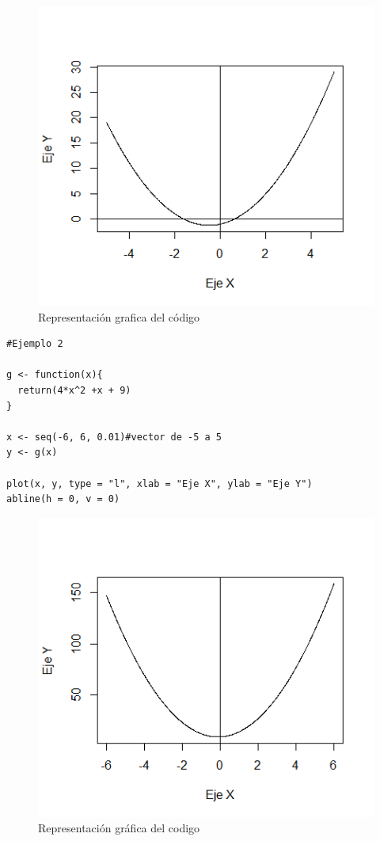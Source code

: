 \documentclass[12pt,a4paper]{article} %
\begin{document}
\begin{figure}
\centering
\includegraphics[scale=0.8]{Parabola1}
\caption{Representación grafica del código}
\label{fig:Parabola}
\end{figure}

\begin{table}[htpb]
	\begin{lstlisting}
#Ejemplo 2

g <- function(x){
  return(4*x^2 +x + 9)
}

x <- seq(-6, 6, 0.01)#vector de -5 a 5
y <- g(x)

plot(x, y, type = "l", xlab = "Eje X", ylab = "Eje Y") 
abline(h = 0, v = 0)
	\end{lstlisting}
	\caption{Segundo código en R para gráficar la parabola de la figura \ref{fig:Parabola2}.}
\label{alg:Parabola2}	
\end{table}

\begin{figure}
\centering
\includegraphics[scale=0.8]{Parabola2}
\caption{Representación gráfica del codigo }
\label{fig:Parabola2}
\end{figure}
\end{document}
